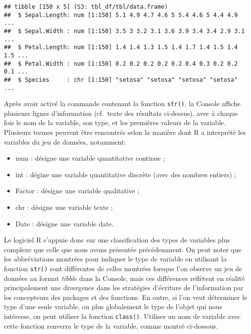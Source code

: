 \documentclass[
  french,
]{book}
\newenvironment{Shaded}{\begin{snugshade}}{\end{snugshade}}
\newcommand{\DataTypeTok}[1]{\textcolor[rgb]{0.13,0.29,0.53}{#1}}
\newcommand{\KeywordTok}[1]{\textcolor[rgb]{0.13,0.29,0.53}{\textbf{#1}}}
\newcommand{\NormalTok}[1]{#1}
\newcommand{\OperatorTok}[1]{\textcolor[rgb]{0.81,0.36,0.00}{\textbf{#1}}}
\providecommand{\tightlist}{%
  \setlength{\itemsep}{0pt}\setlength{\parskip}{0pt}}
\begin{document}
\begin{verbatim}
## tibble [150 x 5] (S3: tbl_df/tbl/data.frame)
##  $ Sepal.Length: num [1:150] 5.1 4.9 4.7 4.6 5 5.4 4.6 5 4.4 4.9 ...
##  $ Sepal.Width : num [1:150] 3.5 3 3.2 3.1 3.6 3.9 3.4 3.4 2.9 3.1 ...
##  $ Petal.Length: num [1:150] 1.4 1.4 1.3 1.5 1.4 1.7 1.4 1.5 1.4 1.5 ...
##  $ Petal.Width : num [1:150] 0.2 0.2 0.2 0.2 0.2 0.4 0.3 0.2 0.2 0.1 ...
##  $ Species     : chr [1:150] "setosa" "setosa" "setosa" "setosa" ...
\end{verbatim}

Après avoir activé la commande contenant la fonction \texttt{str()}, la Console affiche plusieurs lignes d'information (cf.~texte des résultats ci-dessus), avec à chaque fois le nom de la variable, son type, et les premières valeurs de la variable. Plusieurs termes peuvent être rencontrés selon la manière dont R a interprété les variables du jeu de données, notamment:

\begin{itemize}
\tightlist
\item
  num : désigne une variable quantitative continue ;
\item
  int : dégine une variable quantitative discrète (avec des nombres entiers) ;
\item
  Factor : désigne une variable qualitative ;
\item
  chr : désigne une variable texte ;
\item
  Date : désigne une variable date.
\end{itemize}

Le logiciel R s'appuie donc sur une classification des types de variables plus complexe que celle que nous avons présentée précédemment. On peut noter que les abbréviations montrées pour indiquer le type de variable en utilisant la fonction \texttt{str()} sont différentes de celles montrées lorsque l'on observe un jeu de données au format \emph{tibble} dans la Console, mais ces différences reflètent en réalité principalement une divergence dans les stratégies d'écriture de l'information par les concepteurs des packages et des fonctions. En outre, si l'on veut déterminer le type d'une seule variable, ou plus globalement le type de l'objet qui nous intéresse, on peut utiliser la fonction \texttt{class()}. Utiliser un nom de variable avec cette fonction renverra le type de la variable, comme montré ci-dessous.

\begin{Shaded}
\end{Shaded}
\end{document}
